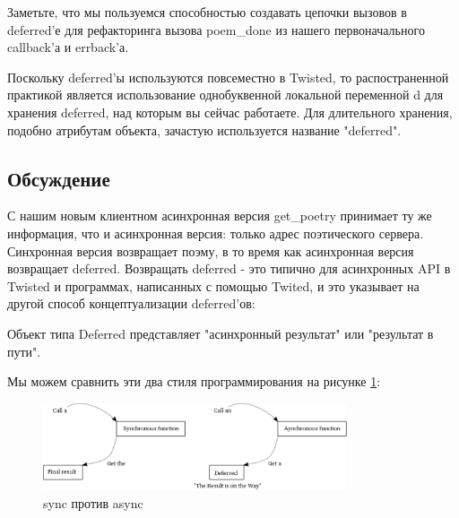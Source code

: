 Заметьте, что мы пользуемся способностью создавать цепочки 
вызовов в deferred'е для рефакторинга вызова poem\_done из 
нашего первоначального callback'а и errback'а.


Поскольку deferred'ы используются повсеместно в Twisted, 
то распостраненной практикой является использование 
однобуквенной локальной переменной d для хранения deferred, 
над которым вы сейчас работаете. Для длительного хранения, 
подобно атрибутам объекта, зачастую используется 
название "deferred".


\subsection{Обсуждение}

С нашим новым клиентном асинхронная версия get\_poetry 
принимает ту же информация, что и асинхронная версия: 
только адрес поэтического сервера. Синхронная версия 
возвращает поэму, в то время как асинхронная версия 
возвращает deferred. Возвращать deferred - это типично для 
асинхронных API в Twisted и программах, написанных с 
помощью Twited, и это указывает на другой способ концептуализации deferred'ов:


Объект типа Deferred представляет "асинхронный результат" или 
"результат в пути".


Мы можем сравнить эти два стиля программирования на рисунке \ref{fig:sync-async}:

\begin{figure}[h]
\begin{center}
    \includegraphics[width=0.8\textwidth]{images/sync-async.pdf}
    \caption{sync против async\label{fig:sync-async}}
\end{center}
\end{figure}


